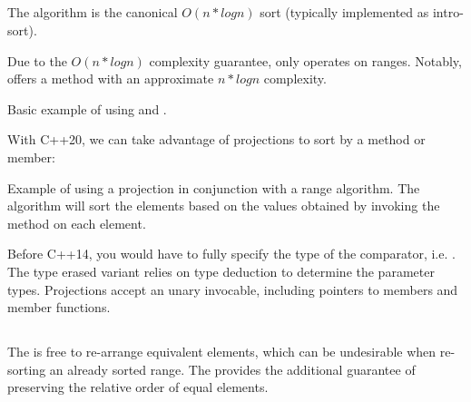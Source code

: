\subsection{\texorpdfstring{}{\texttt{std::sort}}}

The  algorithm is the canonical $O(n*logn)$ sort (typically implemented as intro-sort).


Due to the $O(n*logn)$ complexity guarantee,  only operates on  ranges. Notably,  offers a method with an approximate $n*logn$ complexity.

\begin{box-note}
\footnotesize Basic example of using  and .
\tcblower
{}
\end{box-note}

With C++20, we can take advantage of projections to sort by a method or member:

\begin{box-note}
\footnotesize Example of using a projection in conjunction with a range algorithm. The algorithm will sort the elements based on the values obtained by invoking the method  on each element.
\tcblower
{}
\end{box-note}

Before C++14, you would have to fully specify the type of the comparator, i.e. . The type erased variant  relies on type deduction to determine the parameter types. Projections accept an unary invocable, including pointers to members and member functions.

\subsection{\texorpdfstring{}{\texttt{std::stable\_sort}}}

The  is free to re-arrange equivalent elements, which can be undesirable when re-sorting an already sorted range. The  provides the additional guarantee of preserving the relative order of equal elements.


